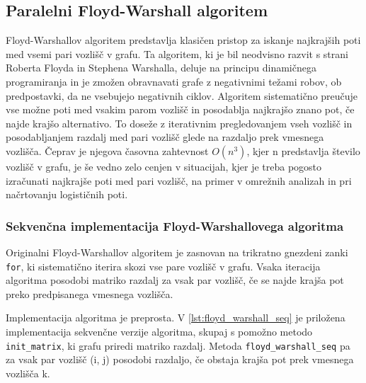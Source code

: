 \documentclass[mat1, tisk]{fmfdelo}
\begin{document}
\subsection{Paralelni Floyd-Warshall algoritem}

Floyd-Warshallov algoritem predstavlja klasičen pristop za iskanje najkrajših poti med vsemi pari vozlišč v grafu.
Ta algoritem, ki je bil neodvisno razvit s strani Roberta Floyda in Stephena Warshalla, deluje na principu dinamičnega
programiranja in je zmožen obravnavati grafe z negativnimi težami robov, ob predpostavki, da ne vsebujejo negativnih ciklov.
Algoritem sistematično preučuje vse možne poti med vsakim parom vozlišč in posodablja najkrajšo znano pot, če najde krajšo alternativo.
To doseže z iterativnim pregledovanjem vseh vozlišč in posodabljanjem razdalj med pari vozlišč glede na razdaljo prek vmesnega vozlišča.
Čeprav je njegova časovna zahtevnost $O(n^3)$, kjer n predstavlja število vozlišč v grafu, je še vedno zelo cenjen v situacijah, kjer
je treba pogosto izračunati najkrajše poti med pari vozlišč, na primer v omrežnih analizah in pri načrtovanju logističnih poti.

\subsubsection{Sekvenčna implementacija Floyd-Warshallovega algoritma}

Originalni Floyd-Warshallov algoritem je zasnovan na trikratno gnezdeni zanki \texttt{for}, ki sistematično iterira skozi vse pare vozlišč v grafu.
Vsaka iteracija algoritma posodobi matriko razdalj za vsak par vozlišč, če se najde krajša pot preko predpisanega vmesnega vozlišča.

Implementacija algoritma je preprosta. V \ref{lst:floyd_warshall_seq} je priložena implementacija sekvenčne verzije algoritma, skupaj s pomožno metodo
\texttt{init\_matrix}, ki grafu priredi matriko razdalj. Metoda \texttt{floyd\_warshall\_seq} pa za vsak par vozlišč (i, j)
posodobi razdaljo, če obstaja krajša pot prek vmesnega vozlišča k.
\end{document}
